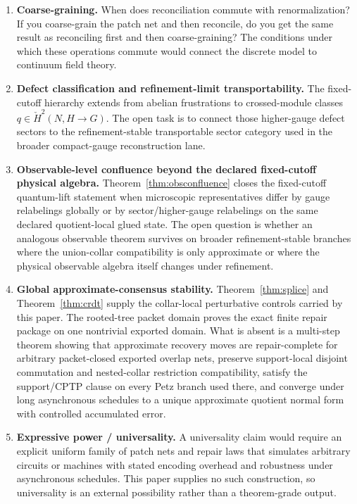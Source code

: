 \documentclass[11pt]{article}
\theoremstyle{remark}
\theoremstyle{plain}
\begin{document}
\begin{enumerate}
\item \textbf{Coarse-graining.} When does reconciliation commute with renormalization? If you coarse-grain the patch net and then reconcile, do you get the same result as reconciling first and then coarse-graining? The conditions under which these operations commute would connect the discrete model to continuum field theory.

\item \textbf{Defect classification and refinement-limit transportability.} The fixed-cutoff hierarchy extends from abelian frustrations to crossed-module classes \(q\in \check H^2(N,H\to G)\). The open task is to connect those higher-gauge defect sectors to the refinement-stable transportable sector category used in the broader compact-gauge reconstruction lane.

\item \textbf{Observable-level confluence beyond the declared fixed-cutoff physical algebra.} Theorem~\ref{thm:obsconfluence} closes the fixed-cutoff quantum-lift statement when microscopic representatives differ by gauge relabelings globally or by sector/higher-gauge relabelings on the same declared quotient-local glued state. The open question is whether an analogous observable theorem survives on broader refinement-stable branches where the union-collar compatibility is only approximate or where the physical observable algebra itself changes under refinement.

\item \textbf{Global approximate-consensus stability.} Theorem~\ref{thm:splice} and Theorem~\ref{thm:crdt} supply the collar-local perturbative controls carried by this paper. The rooted-tree packet domain proves the exact finite repair package on one nontrivial exported domain. What is absent is a multi-step theorem showing that approximate recovery moves are repair-complete for arbitrary packet-closed exported overlap nets, preserve support-local disjoint commutation and nested-collar restriction compatibility, satisfy the support/CPTP clause on every Petz branch used there, and converge under long asynchronous schedules to a unique approximate quotient normal form with controlled accumulated error.

\item \textbf{Expressive power / universality.} A universality claim would require an explicit uniform family of patch nets and repair laws that simulates arbitrary circuits or machines with stated encoding overhead and robustness under asynchronous schedules. This paper supplies no such construction, so universality is an external possibility rather than a theorem-grade output.


\end{enumerate}
\end{document}
